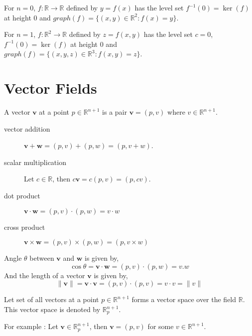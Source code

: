 \begin{remark}
	For $n = 0$, $f : \mathbb{R} \to \mathbb{R}$ defined by $y = f(x)$ has the level set $f^{-1}(0) = \ker(f)$ at height $0$ and $graph(f) = \{ (x,y) \in \mathbb{R}^2 : f(x) = y \}$.

	For $n = 1$, $f : \mathbb{R}^2 \to \mathbb{R}$ defined by $z = f(x,y)$ has the level set $c = 0$, $f^{-1}(0) = \ker(f)$ at height $0$ and $graph(f) = \{ (x,y,z) \in \mathbb{R}^3 : f(x,y) = z \}$.
\end{remark}

\section{Vector Fields}
\begin{definition}
	A vector $\mathbf{v}$ at a point $p \in \mathbb{R}^{n+1}$ is a pair $\mathbf{v} = (p,v)$ where $v \in \mathbb{R}^{n+1}$.
\end{definition}
\begin{description}
	\item[vector addition] $\mathbf{v} + \mathbf{w} = (p,v) + (p,w) = (p,v+w)$.
	\item[scalar multiplication] Let $c \in \mathbb{R}$, then $c \mathbf{v} =  c(p,v) = (p,cv)$.
	\item[dot product] $\mathbf{v}\cdot \mathbf{w} = (p,v)\cdot(p,w) = v \cdot w$
	\item[cross product] $\mathbf{v}\times \mathbf{w} = (p,v)\times(p,w) = (p,v \times w)$
\end{description}
\begin{remark}
	Angle $\theta$ between $\mathbf{v}$ and $\mathbf{w}$ is given by,
	\begin{equation}
		\cos \theta = \mathbf{v}\cdot\mathbf{w} = (p,v)\cdot(p,w) = v.w
	\end{equation}
	And the length of a vector $\mathbf{v}$ is given by,
	\begin{equation}
		\|\mathbf{v}\| = \mathbf{v}\cdot\mathbf{v} = (p,v)\cdot(p,v) = v\cdot v = \| v \|
	\end{equation}
\end{remark}

\begin{remark}
	Let set of all vectors at a point $p \in \mathbb{R}^{n+1}$ forms a vector space over the field $\mathbb{R}$.
	This vector space is denoted by $\mathbb{R}_p^{n+1}$.

	For example : Let $\mathbf{v} \in \mathbb{R}_p^{n+1}$, then $\mathbf{v} = (p,v)$ for some $v \in \mathbb{R}^{n+1}$.
\end{remark}

